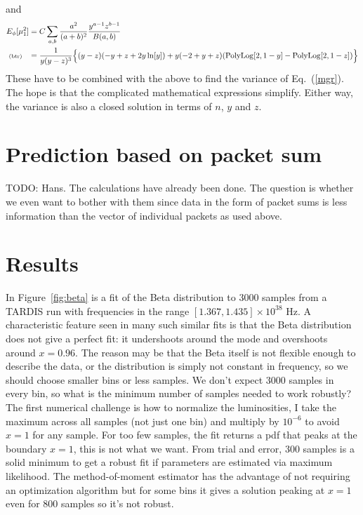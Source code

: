 \documentclass[11pt]{article}
\newcommand{\fred}[1]{\todo[inline]{#1}} %
\newcommand{\lleq}[1]{\label{#1} }
\renewcommand{\lleq}[1]{\label{#1} {\scriptstyle {\rm (#1)}} \hspace*{2ex} }
\begin{document}
and
\begin{align}
  E_\phi[\mu_1^2] &= C\sum_{a,b} \frac{a^2}{(a+b)^2}
  \frac{y^{a-1}z^{b-1}}{B(a,b)}
  \nonumber\\
  \lleq{btr} %
  &= \frac{1}{y (y - z)^3}
  \Bigl\{
  (y - z) (-y + z + 2 y \ln[y]) + y (-2 + y + z)
  (\mathrm{PolyLog}[2, 1 - y] - \mathrm{PolyLog}[2, 1 - z])
  \Bigr\}
\end{align}
These have to be combined with the above to find the variance of
Eq.~(\ref{mgr}). The hope is that the complicated mathematical
expressions simplify. Either way, the variance is also a closed
solution in terms of $n$, $y$ and $z$.

\section{Prediction based on packet sum}

TODO: Hans. The calculations have already been done. The question is
whether we even want to bother with them since data in the form of
packet sums is less information than the vector of individual packets
as used above.
\fred{No, we don't want to bother.}

\section{Results}

In Figure~\ref{fig:beta} is a fit of the Beta distribution to 3000
samples from a TARDIS run with frequencies in the range $[1.367,
1.435] \times 10^{38}$ Hz. A characteristic feature seen in many such
similar fits is that the Beta distribution does not give a perfect
fit: it undershoots around the mode and overshoots around
$x=0.96$. The reason may be that the Beta itself is not flexible
enough to describe the data, or the distribution is simply not
constant in frequency, so we should choose smaller bins or less
samples. We don't expect 3000 samples in every bin, so what is the
minimum number of samples needed to work robustly? The first numerical
challenge is how to normalize the luminosities, I take the maximum
across all samples (not just one bin) and multiply by $10^{-6}$ to
avoid $x=1$ for any sample. For too few samples, the fit returns a pdf
that peaks at the boundary $x=1$, this is not what we want. From trial
and error, 300 samples is a solid minimum to get a robust fit if
parameters are estimated via maximum likelihood. The method-of-moment
estimator has the advantage of not requiring an optimization algorithm
but for some bins it gives a solution peaking at $x=1$ even for 800
samples so it's not robust.
\end{document}
